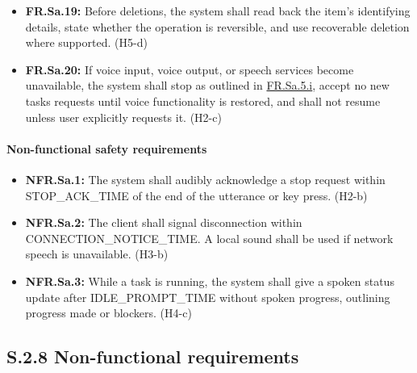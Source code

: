 \documentclass{scrreprt}
\theoremstyle{definition}
\newcommand{\reqtarget}[1]{\hypertarget{req:#1}{#1}}
\newcommand{\reqlink}[1]{\hyperlink{req:#1}{#1}}
\begin{document}
\begin{itemize}
  \item \textbf{\reqtarget{FR.Sa.19}:} Before deletions, the system shall read back the item's identifying details, state whether the operation is reversible, and use recoverable deletion where supported. (H5-d)
  \item \textbf{\reqtarget{FR.Sa.20}:} If voice input, voice output, or speech services become unavailable, the system shall stop as outlined in \reqlink{FR.Sa.5.i}, accept no new tasks requests until voice functionality is restored, and shall not resume unless user explicitly requests it. (H2-c)
\end{itemize}

\paragraph{Non-functional safety requirements}
\begin{itemize}
  \item \textbf{\reqtarget{NFR.Sa.1}:} The system shall audibly acknowledge a stop request within STOP\_ACK\_TIME of the end of the utterance or key press. (H2-b)
  \item \textbf{\reqtarget{NFR.Sa.2}:} The client shall signal disconnection within CONNECTION\_NOTICE\_TIME. A local sound shall be used if network speech is unavailable. (H3-b)
  \item \textbf{\reqtarget{NFR.Sa.3}:} While a task is running, the system shall give a spoken status update after IDLE\_PROMPT\_TIME without spoken progress, outlining progress made or blockers. (H4-c)
\end{itemize}

\subsection*{S.2.8 Non-functional requirements}
\end{document}
